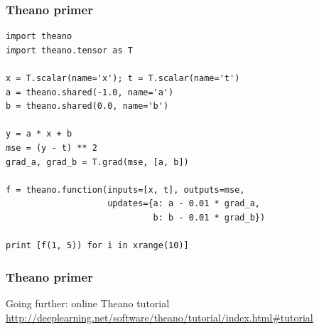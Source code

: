 \documentclass[mathserif, xcolor=dvipsnames]{beamer}
\begin{document}
\begin{frame}[fragile]
    \frametitle{Theano primer}
    \begin{examples}
\begin{lstlisting}[caption=Linear regression]
import theano
import theano.tensor as T

x = T.scalar(name='x'); t = T.scalar(name='t')
a = theano.shared(-1.0, name='a')
b = theano.shared(0.0, name='b')

y = a * x + b
mse = (y - t) ** 2
grad_a, grad_b = T.grad(mse, [a, b])

f = theano.function(inputs=[x, t], outputs=mse,
                    updates={a: a - 0.01 * grad_a,
                             b: b - 0.01 * grad_b})

print [f(1, 5)) for i in xrange(10)]
\end{lstlisting}
    \end{examples}
\end{frame}

\begin{frame}
    \frametitle{Theano primer}
    \begin{alertblock}{Going further: online Theano tutorial}
    \url{http://deeplearning.net/software/theano/tutorial/index.html\#tutorial}
    \end{alertblock}
\end{frame}
\end{document}
